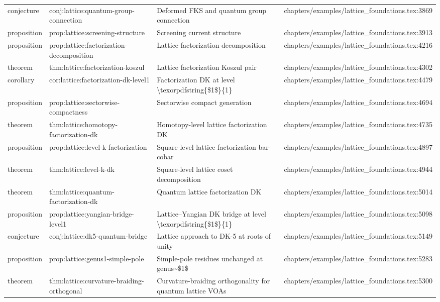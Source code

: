 \documentclass[11pt]{article}
\begin{document}
\begin{longtable}{L{0.10\textwidth}L{0.26\textwidth}L{0.42\textwidth}L{0.22\textwidth}}
conjecture & conj:lattice:quantum-group-connection & Deformed FKS and quantum group connection & chapters/examples/lattice\_foundations.tex:3869\\
proposition & prop:lattice:screening-structure & Screening current structure & chapters/examples/lattice\_foundations.tex:3913\\
proposition & prop:lattice:factorization-decomposition & Lattice factorization decomposition & chapters/examples/lattice\_foundations.tex:4216\\
theorem & thm:lattice:factorization-koszul & Lattice factorization Koszul pair & chapters/examples/lattice\_foundations.tex:4302\\
corollary & cor:lattice:factorization-dk-level1 & Factorization DK at level \textbackslash{}texorpdfstring\{\$1\$\}\{1\} & chapters/examples/lattice\_foundations.tex:4479\\
proposition & prop:lattice:sectorwise-compactness & Sectorwise compact generation & chapters/examples/lattice\_foundations.tex:4694\\
theorem & thm:lattice:homotopy-factorization-dk & Homotopy-level lattice factorization DK & chapters/examples/lattice\_foundations.tex:4735\\
proposition & prop:lattice:level-k-factorization & Square-level lattice factorization bar-cobar & chapters/examples/lattice\_foundations.tex:4897\\
theorem & thm:lattice:level-k-dk & Square-level lattice coset decomposition & chapters/examples/lattice\_foundations.tex:4944\\
theorem & thm:lattice:quantum-factorization-dk & Quantum lattice factorization DK & chapters/examples/lattice\_foundations.tex:5014\\
proposition & prop:lattice:yangian-bridge-level1 & Lattice--Yangian DK bridge at level \textbackslash{}texorpdfstring\{\$1\$\}\{1\} & chapters/examples/lattice\_foundations.tex:5098\\
conjecture & conj:lattice:dk5-quantum-bridge & Lattice approach to DK-5 at roots of unity & chapters/examples/lattice\_foundations.tex:5149\\
proposition & prop:lattice:genus1-simple-pole & Simple-pole residues unchanged at genus\textasciitilde{}\$1\$ & chapters/examples/lattice\_foundations.tex:5283\\
theorem & thm:lattice:curvature-braiding-orthogonal & Curvature-braiding orthogonality for quantum lattice VOAs & chapters/examples/lattice\_foundations.tex:5300\\

\end{longtable}
\end{document}

